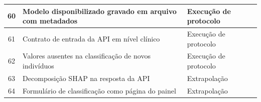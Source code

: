 \begin{quadro}[H]
\begin{tabular}{|c|p{9.2cm}|p{4.2cm}|}
    60 & Modelo disponibilizado gravado em arquivo com metadados & Execução de protocolo \\ \hline
    61 & Contrato de entrada da API em nível clínico & Execução de protocolo \\ \hline
    62 & Valores ausentes na classificação de novos indivíduos & Execução de protocolo \\ \hline
    63 & Decomposição SHAP na resposta da API & Extrapolação \\ \hline
    64 & Formulário de classificação como página do painel & Extrapolação \\ \hline
  \end{tabular}
\end{quadro}
